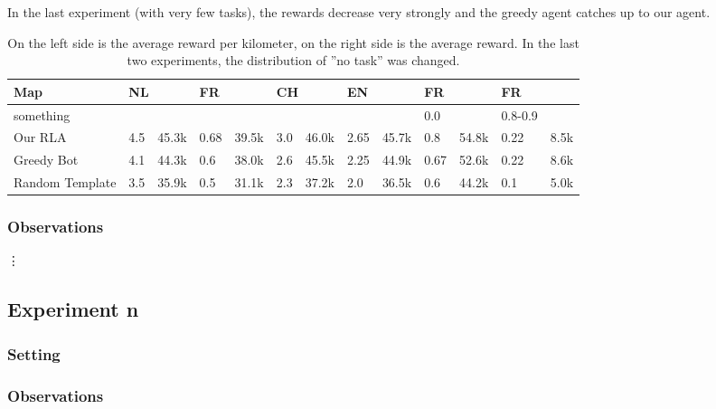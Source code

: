 \documentclass[11pt]{article}
\begin{document}
\begin{description}
In the last experiment (with very few tasks), the rewards decrease very strongly and the greedy agent catches up to our agent.
\begin{table}[]
	\centering
	\caption{On the left side is the average reward per kilometer, on the right side is the average reward.
	In the last two experiments, the distribution of ''no task'' was changed.}
	\label{my-label}
	\begin{tabular}{@{}lllllllllllll@{}}
		\toprule
		Map             & \multicolumn{2}{l}{NL} & \multicolumn{2}{l}{FR} & \multicolumn{2}{l}{CH} & \multicolumn{2}{l}{EN} & \multicolumn{2}{l}{FR} & \multicolumn{2}{l}{FR} \\ \midrule
		something       &           &            &           &            &           &            &           &            & 0.0       &            & 0.8-0.9     &          \\
		Our RLA         & 4.5       & 45.3k      & 0.68      & 39.5k      & 3.0       & 46.0k      & 2.65      & 45.7k      & 0.8       & 54.8k      & 0.22        & 8.5k     \\
		Greedy Bot      & 4.1       & 44.3k      & 0.6       & 38.0k      & 2.6       & 45.5k      & 2.25      & 44.9k      & 0.67      & 52.6k      & 0.22        & 8.6k     \\
		Random Template & 3.5       & 35.9k      & 0.5       & 31.1k      & 2.3       & 37.2k      & 2.0       & 36.5k      & 0.6       & 44.2k      & 0.1         & 5.0k     \\ \bottomrule
	\end{tabular}
\end{table}

\end{description}



\subsubsection{Observations}

\vdots

\subsection{Experiment n}

\subsubsection{Setting}

\subsubsection{Observations}
\end{document}
